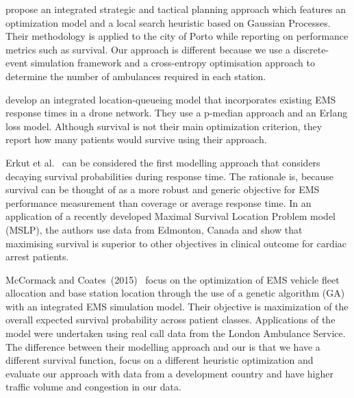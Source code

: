 \documentclass[preprint,12pt]{elsarticle}
\begin{document}

\citet{amorim2019integrated} propose an integrated strategic and tactical
planning approach which features an optimization model and a local search
heuristic based on Gaussian Processes.  Their methodology is applied to the city
of Porto while reporting on performance metrics such as survival. Our approach
is different because we use a discrete-event simulation framework and a
cross-entropy optimisation approach to determine the number of ambulances
required in each station. 


\citet{boutilier2022drone} develop an integrated location-queueing model that
incorporates existing EMS response times in a drone network. They use a p-median
approach and an Erlang loss model. Although survival is not their main
optimization criterion,  they report how many patients would survive using their
approach.

Erkut et al.~\cite{Erkut200842} can be considered the first modelling approach
that considers decaying survival probabilities during response time.  The
rationale is, because survival can be thought of as a more robust and generic
objective for EMS performance measurement than coverage or average response
time. In an application of a recently developed Maximal Survival Location
Problem model (MSLP), the authors use data from Edmonton, Canada and  show that
maximising survival is superior to other objectives in clinical outcome for
cardiac arrest patients.

McCormack and Coates~(2015)~\cite{MCormack2015} focus on the optimization of EMS
vehicle fleet allocation and base station location through the use of a genetic
algorithm (GA) with an integrated EMS simulation model. Their objective is
maximization of the overall expected survival probability across patient
classes. Applications of the model were undertaken using real call data from the
London Ambulance Service. The difference between their modelling approach and
our is that we have a different survival function, focus on a different
heuristic optimization and evaluate our approach with data from a development
country and have higher traffic volume and congestion in our data. 
\end{document}

